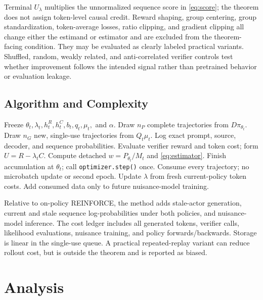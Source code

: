 \documentclass{article}
\begin{document}
Terminal $U_\lambda$ multiplies the unnormalized sequence score in
\cref{eq:score}; the theorem does not assign token-level causal credit. Reward
shaping, group centering, group standardization, token-average losses, ratio
clipping, and gradient clipping all change either the estimand or estimator and
are excluded from the theorem-facing condition. They may be evaluated as
clearly labeled practical variants. Shuffled, random, weakly related, and
anti-correlated verifier controls test whether improvement follows the intended
signal rather than pretrained behavior or evaluation leakage.

\subsection{Algorithm and Complexity}

\begin{algorithm}[t]
\caption{One Adaptive-Mixture Update}
\label{alg:am}
\begin{algorithmic}[1]
\STATE Freeze $\theta_t,\lambda_t,h_t^R,h_t^C,b_t,q_t,\mu_t,$ and $\alpha$.
\STATE Draw $n_P$ complete trajectories from $D\pi_{\theta_t}$.
\STATE Draw $n_G$ new, single-use trajectories from $Q_t\mu_t$.
\STATE Log exact prompt, source, decoder, and sequence probabilities.
\STATE Evaluate verifier reward and token cost; form $U=R-\lambda_tC$.
\STATE Compute detached $w=P_{\theta_t}/M_t$ and \cref{eq:estimator}.
\STATE Finish accumulation at $\theta_t$; call \texttt{optimizer.step()} once.
\STATE Consume every trajectory; no microbatch update or second epoch.
\STATE Update $\lambda$ from fresh current-policy token costs.
\STATE Add consumed data only to future nuisance-model training.
\end{algorithmic}
\end{algorithm}

Relative to on-policy REINFORCE, the method adds stale-actor generation, current
and stale sequence log-probabilities under both policies, and nuisance-model
inference. The cost ledger includes all generated tokens, verifier calls,
likelihood evaluations, nuisance training, and policy forwards/backwards.
Storage is linear in the single-use queue. A practical repeated-replay variant
can reduce rollout cost, but is outside the theorem and is reported as biased.

\section{Analysis}
\label{sec:analysis}
\end{document}
